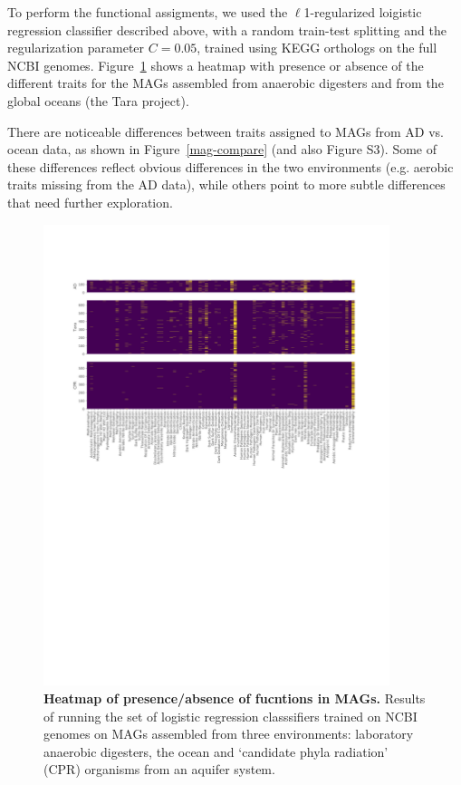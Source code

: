 \documentclass[10pt,letterpaper]{article}
\begin{document}
To perform the functional assigments, we used the $\ell$1-regularized loigistic regression classifier described above, with a random train-test splitting and the regularization parameter $C=0.05$, trained using KEGG orthologs on the full NCBI genomes. Figure~\ref{heatmap} shows a heatmap with presence or absence of the different traits for the MAGs assembled from anaerobic digesters and from the global oceans (the Tara project). 

There are noticeable differences between traits assigned to MAGs from AD vs. ocean data, as shown in Figure~\ref{mag-compare} (and also Figure S3). Some of these differences reflect obvious differences in the two environments (e.g. aerobic traits missing from the AD data), while others point to more subtle differences that need further exploration.

\begin{figure}
\includegraphics[width=0.9\textwidth]{mag_heatmaps_cpr}
\caption{{\bf Heatmap of presence/absence of fucntions in MAGs.}
Results of running the set of logistic regression classsifiers trained on NCBI genomes on MAGs assembled from three environments: laboratory anaerobic digesters, the ocean and `candidate phyla radiation' (CPR) organisms from an aquifer system.}
\label{heatmap}
\end{figure}
\end{document}
